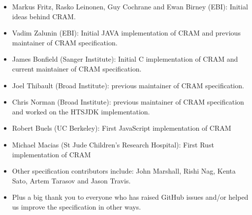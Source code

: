 \documentclass[a4paper]{article}
\begin{document}
\begin{itemize}
\item
Markus Fritz, Rasko Leinonen, Guy Cochrane and Ewan Birney (EBI):
Initial ideas behind CRAM.

\item Vadim Zalunin (EBI):
Initial JAVA implementation of CRAM and previous maintainer of CRAM specification.

\item James Bonfield (Sanger Institute):
Initial C implementation of CRAM and current maintainer of CRAM
specification.

\item Joel Thibault (Broad Institute):
previous maintainer of CRAM specification.

\item Chris Norman (Broad Institute):
previous maintainer of CRAM specification and worked on
the HTSJDK implementation.

\item Robert Buels (UC Berkeley): First JavaScript implementation of CRAM

\item Michael Macias (St Jude Children's Research Hospital): First Rust implementation of CRAM

\item Other specification contributors include: John Marshall, Rishi Nag,
Kenta Sato, Artem Tarasov and Jason Travis.

\item Plus a big thank you to everyone who has raised GitHub issues
and/or helped us improve the specification in other ways.
\end{itemize}
\end{document}
